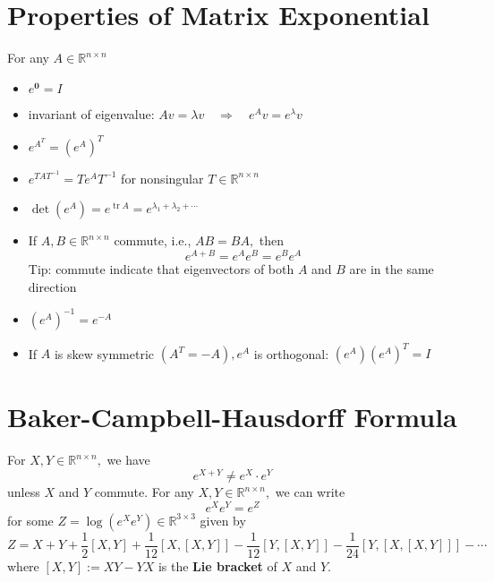 \documentclass[10pt,a4paper,oneside]{article}
\begin{document}
\section{Properties of Matrix Exponential}
For any $A\in\mathbb{R}^{n\times n}$
\begin{itemize}
\item $e^{\mathbf{0}}=I$
\item invariant of eigenvalue: $A v=\lambda v \quad \Rightarrow \quad e^{A} v=e^{\lambda} v$
\item $e^{A^{T}}=\left(e^{A}\right)^{T}$
\item $e^{T A T^{-1}}=T e^{A} T^{-1}$ for nonsingular $T \in \mathbb{R}^{n \times n}$
\item $\operatorname{det}\left(e^{A}\right)=e^{\operatorname{tr} A} = e^{\lambda_1 + \lambda_2 + \cdots}$
\item If $A, B \in \mathbb{R}^{n \times n}$ commute, i.e., $A B=B A,$ then
\[
e^{A+B}=e^{A} e^{B}=e^{B} e^{A}
\]
Tip: commute indicate that eigenvectors of both $A$ and $B$ are in the same direction
\item $\left(e^{A}\right)^{-1}=e^{-A}$
\item If $A$ is skew symmetric $\left(A^{T}=-A\right), e^{A}$ is orthogonal: $\left(e^{A}\right)\left(e^{A}\right)^{T}=I$
\end{itemize}

\section{Baker-Campbell-Hausdorff Formula}
For $X, Y \in \mathbb{R}^{n \times n},$ we have 
\[
e^{X+Y} \neq e^{X} \cdot e^{Y}
\] 
unless $X$ and $Y$ commute. For any $X, Y \in \mathbb{R}^{n \times n},$ we can write
\[
e^{X} e^{Y}=e^{Z}
\]
for some $Z=\log \left(e^{X} e^{Y}\right) \in \mathbb{R}^{3 \times 3}$ given by
\[
Z=X+Y+\frac{1}{2}[X, Y]+\frac{1}{12}[X,[X, Y]]-\frac{1}{12}[Y,[X, Y]]-\frac{1}{24}[Y,[X,[X, Y]]]-\cdots
\]
where $[X, Y] :=X Y-Y X$ is the \textbf{Lie bracket} of $X$ and $Y$.
\end{document}

